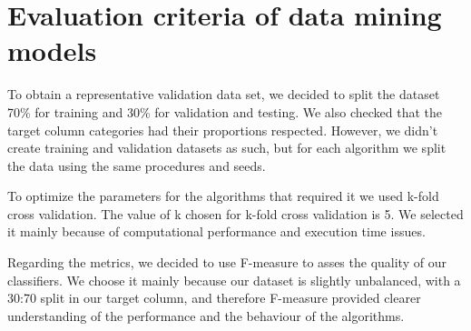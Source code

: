 
\section{Evaluation criteria of data mining models}%
\label{sec:eval-criteria}


To obtain a representative validation data set, we decided to split the dataset 70\%
for training and 30\% for validation and testing. We also checked that the target
column categories had their proportions respected. However, we didn't create training
and validation datasets as such, but for each algorithm we split the data using the same
procedures and seeds.

To optimize the parameters for the algorithms that required it we used k-fold cross 
validation. The value of k chosen for k-fold cross validation is 5. We selected it mainly
because of computational performance and execution time issues.

Regarding the metrics, we decided to use F-measure to asses the quality of our 
classifiers. We choose it mainly because our dataset is slightly unbalanced, with
a 30:70 split in our target column, and therefore F-measure provided 
clearer understanding of the performance and the behaviour of the algorithms.